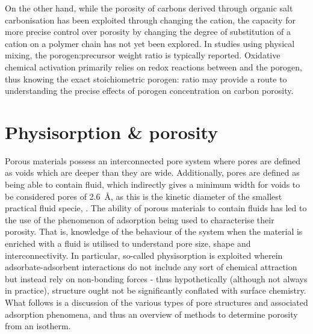 On the other hand, while the porosity of carbons derived through organic salt carbonisation has been exploited through changing the cation,\citep{Sevilla2013general, Tsumura2014Structure, Ferrero2015Mesoporous, Ferrero2016Efficient, Fuertes2015Hierarchical, Roberts2015Hierarchically, Yadav20123D, Yang2018Spontaneous} the capacity for more precise control over porosity by changing the degree of substitution of a cation on a polymer chain has not yet been explored. In studies using physical mixing, the \gls{porogen}:precursor weight ratio is typically reported.\citep{Altwala2020Predictable, Adeniran2015Compactivation, Blankenship2017Cigarette, Sevilla2016green, Ludwinowicz2015Potassium, Deng2015Inspired, Alhamed2015Preparation, Hu2003simple} Oxidative chemical activation primarily relies on redox reactions between  and the \gls{porogen}, thus knowing the exact stoichiometric  \gls{porogen}: ratio may provide a route to understanding the precise effects of \gls{porogen} concentration on carbon porosity.


\section{Physisorption \& porosity}
\label{s:adsorption_porosity}
Porous materials possess an interconnected pore system where pores are defined as voids which are deeper than they are wide.\citep{mcnaught1997compendium, Thommes2015Physisorption} Additionally, pores are defined as being able to contain fluid, which indirectly gives a minimum width for voids to be considered pores of \qty{2.6}{\angstrom}, as this is the kinetic diameter of the smallest practical fluid specie, .\citep{Thommes2015Physisorption, Lide2007Handbook} The ability of porous materials to contain fluids has led to the use of the phenomenon of adsorption being used to characterise their porosity. That is, knowledge of the behaviour of the system when the material is enriched with a fluid is utilised to understand pore size, shape and interconnectivity. In particular, so-called \gls{physisorption} is exploited wherein \gls{adsorbate}-\gls{adsorbent} interactions do not include any sort of chemical attraction but instead rely on non-bonding forces\citep{Thommes2015Physisorption} - thus hypothetically (although not always in practice), structure ought not be significantly conflated with surface chemistry. What follows is a discussion of the various types of pore structures and associated adsorption phenomena, and thus an overview of methods to determine porosity from an isotherm.

